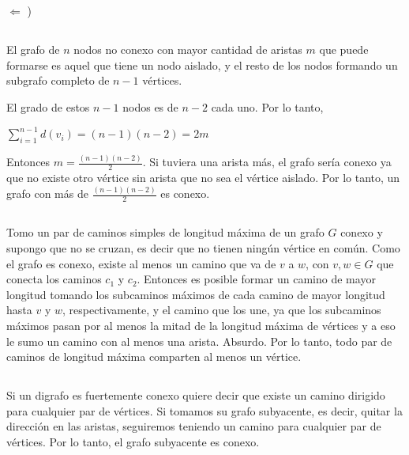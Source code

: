 $\Longleftarrow$ )

\subsection{}

El grafo de $n$ nodos no conexo con mayor cantidad de aristas $m$ que puede formarse es aquel que tiene un nodo aislado, y el resto de los nodos formando un subgrafo completo de $n - 1$ vértices. 

El grado de estos $n - 1$ nodos es de $n - 2$ cada uno. Por lo tanto, 

\begin{center}
$\sum_{i = 1}^{n - 1}d(v_i) = (n - 1)(n - 2) = 2m$
\end{center}

Entonces $m = \frac{(n - 1)(n - 2)}{2}$. Si tuviera una arista más, el grafo sería conexo ya que no existe otro vértice sin arista que no sea el vértice aislado. Por lo tanto, un grafo con más de $\frac{(n - 1)(n - 2)}{2}$ es conexo.

\setcounter{subsection}{8}
\subsection{}

Tomo un par de caminos simples de longitud máxima de un grafo $G$ conexo y supongo que no se cruzan, es decir que no tienen ningún vértice en común. Como el grafo es conexo, existe al menos un camino que va de $v$ a $w$, con $v, w \in G$ que conecta los caminos $c_1$ y $c_2$. Entonces es posible formar un camino de mayor longitud tomando los subcaminos máximos de cada camino de mayor longitud hasta $v$ y $w$, respectivamente, y el camino que los une, ya que los subcaminos máximos pasan por al menos la mitad de la longitud máxima de vértices y a eso le sumo un camino con al menos una arista. Absurdo. Por lo tanto,  todo par de caminos de longitud máxima comparten al menos un vértice.

\subsection{}

\subsubsection{}

Si un digrafo es fuertemente conexo quiere decir que existe un camino dirigido para cualquier par de vértices. Si tomamos su grafo subyacente, es decir, quitar la dirección en las aristas, seguiremos teniendo un camino para cualquier par de vértices. Por lo tanto, el grafo subyacente es conexo.

